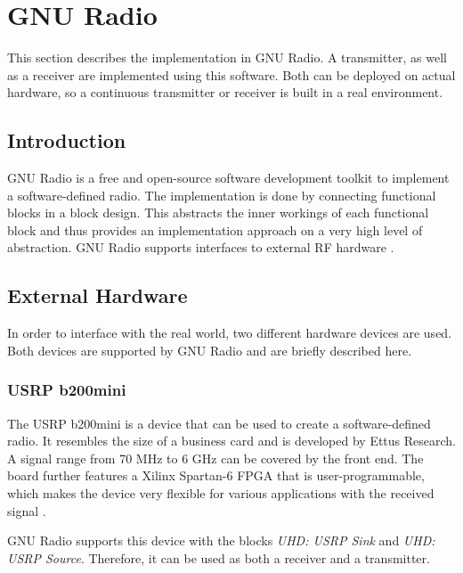 \section{GNU Radio}

This section describes the implementation in GNU Radio.
A transmitter, as well as a receiver are implemented using this software.
Both can be deployed on actual hardware, so a continuous transmitter or receiver is built in a real environment.

\subsection{Introduction}

GNU Radio is a free and open-source software development toolkit to implement a software-defined radio.
The implementation is done by connecting functional blocks in a block design.
This abstracts the inner workings of each functional block and thus provides an implementation approach on a very high level of abstraction.
GNU Radio supports interfaces to external RF hardware \cite{SoftwareGnuRadio}.

\subsection{External Hardware}

In order to interface with the real world, two different hardware devices are used.
Both devices are supported by GNU Radio and are briefly described here.

\subsubsection{USRP b200mini}

The USRP b200mini is a device that can be used to create a software-defined radio.
It resembles the size of a business card and is developed by Ettus Research.
A signal range from 70 MHz to 6 GHz can be covered by the front end.
The board further features a Xilinx Spartan-6 FPGA that is user-programmable, which makes the device very flexible for various applications with the received signal \cite{USRPb200Mini}.

GNU Radio supports this device with the blocks \textit{UHD: USRP Sink} and \textit{UHD: USRP Source}.
Therefore, it can be used as both a receiver and a transmitter.

